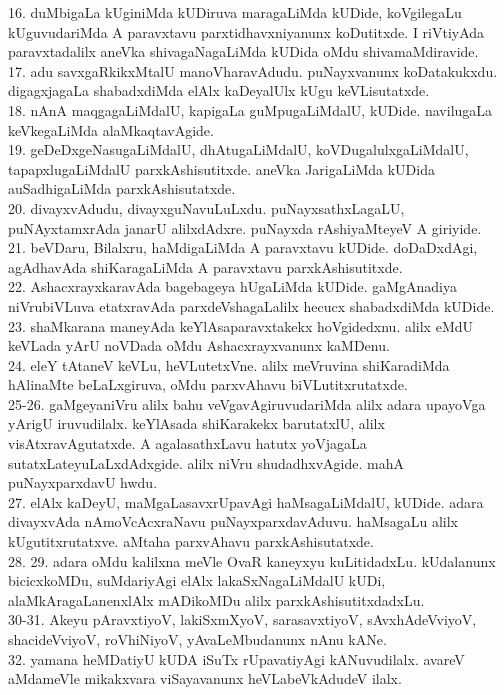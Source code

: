 \documentclass{article}
\begin{document}
16. duMbigaLa kUginiMda kUDiruva maragaLiMda kUDide, koVgilegaLu kUguvudariMda A paravxtavu parxtidhavxniyanunx koDutitxde. I riVtiyAda paravxtadalilx aneVka shivagaNagaLiMda kUDida oMdu shivamaMdiravide.\\
17. adu savxgaRkikxMtalU manoVharavAdudu. puNayxvanunx koDatakukxdu. digagxjagaLa shabadxdiMda elAlx kaDeyalUlx kUgu keVLisutatxde.\\
18. nAnA maqgagaLiMdalU, kapigaLa guMpugaLiMdalU, kUDide. navilugaLa keVkegaLiMda alaMkaqtavAgide.\\
19. geDeDxgeNasugaLiMdalU, dhAtugaLiMdalU, koVDugalulxgaLiMdalU, tapapxlugaLiMdalU parxkAshisutitxde. aneVka JarigaLiMda kUDida auSadhigaLiMda parxkAshisutatxde.\\
20. divayxvAdudu, divayxguNavuLuLxdu. puNayxsathxLagaLU, puNAyxtamxrAda janarU alilxdAdxre. puNayxda rAshiyaMteyeV A giriyide.\\
21. beVDaru, Bilalxru, haMdigaLiMda A paravxtavu kUDide. doDaDxdAgi, agAdhavAda shiKaragaLiMda A paravxtavu parxkAshisutitxde.\\
22. AshacxrayxkaravAda bagebageya hUgaLiMda kUDide. gaMgAnadiya niVrubiVLuva etatxravAda parxdeVshagaLalilx hecucx shabadxdiMda kUDide.\\
23. shaMkarana maneyAda keYlAsaparavxtakekx hoVgidedxnu. alilx eMdU keVLada yArU noVDada oMdu Ashacxrayxvanunx kaMDenu.\\
24. eleY tAtaneV keVLu, heVLutetxVne. alilx meVruvina shiKaradiMda hAlinaMte beLaLxgiruva, oMdu parxvAhavu biVLutitxrutatxde.\\
25-26. gaMgeyaniVru alilx bahu veVgavAgiruvudariMda alilx adara upayoVga yArigU iruvudilalx. keYlAsada shiKarakekx barutatxlU, alilx visAtxravAgutatxde. A agalasathxLavu hatutx yoVjagaLa sutatxLateyuLaLxdAdxgide. alilx niVru shudadhxvAgide. mahA puNayxparxdavU hwdu.\\
27. elAlx kaDeyU, maMgaLasavxrUpavAgi haMsagaLiMdalU, kUDide. adara divayxvAda nAmoVcAcxraNavu puNayxparxdavAduvu. haMsagaLu alilx kUgutitxrutatxve. aMtaha parxvAhavu parxkAshisutatxde.\\
28. 29. adara oMdu kalilxna meVle OvaR kaneyxyu kuLitidadxLu. kUdalanunx bicicxkoMDu, suMdariyAgi elAlx lakaSxNagaLiMdalU kUDi, alaMkAragaLanenxlAlx mADikoMDu alilx parxkAshisutitxdadxLu.\\
30-31. Akeyu pAravxtiyoV, lakiSxmXyoV, sarasavxtiyoV, sAvxhAdeVviyoV, shacideVviyoV, roVhiNiyoV, yAvaLeMbudanunx nAnu kANe.\\
32. yamana heMDatiyU kUDA iSuTx rUpavatiyAgi kANuvudilalx. avareV aMdameVle mikakxvara viSayavanunx heVLabeVkAdudeV ilalx.\\
\end{document}
